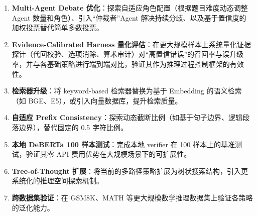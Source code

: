 \documentclass[lang=cn,a4paper,newtx]{elegantpaper}
\begin{document}
\begin{enumerate}
  \item \textbf{Multi-Agent Debate 优化}：探索自适应角色配置（根据题目难度动态调整 Agent 数量和角色）、引入“仲裁者”Agent 解决持续分歧、以及基于置信度的加权投票替代简单多数投票。
  \item \textbf{Evidence-Calibrated Harness 量化评估}：在更大规模样本上系统量化证据探针（代回校验、选项消除、算术审计）对“高置信错误”的召回率与误升级率，并与各基础策略进行端到端对比，验证其作为推理过程控制框架的有效性。
  \item \textbf{检索器升级}：将 keyword-based 检索器替换为基于 Embedding 的语义检索（如 BGE、E5），或引入向量数据库，提升检索质量。
  \item \textbf{自适应 Prefix Consistency}：探索动态截断比例（如基于句子边界、逻辑段落边界），替代固定的 0.5 字符比例。
  \item \textbf{本地 DeBERTa 100 样本测试}：完成本地 verifier 在 100 样本上的基准测试，验证其零 API 费用优势在大规模场景下的可扩展性。
  \item \textbf{Tree-of-Thought 扩展}：将当前的多路径策略扩展为树状搜索结构，引入更系统化的推理空间探索机制。
  \item \textbf{跨数据集验证}：在 GSM8K、MATH 等更大规模数学推理数据集上验证各策略的泛化能力。
\end{enumerate}

\nocite{*}
\printbibliography[heading=bibintoc, title=\ebibname]
\end{document}
